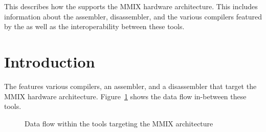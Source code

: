 




\renewcommand{\seemmix}{}

{This \documentation{} describes how the \ecs{} supports the MMIX hardware architecture.
This includes information about the assembler, disassembler, and the various compilers featured by the \ecs{} as well as the interoperability between these tools.}

\section{Introduction}

The \ecs{} features various compilers, an assembler, and a disassembler that target the MMIX hardware architecture.
Figure~\ref{fig:mmixdataflow} shows the data flow in-between these tools.

\begin{figure}
\caption{Data flow within the tools targeting the MMIX architecture}
\label{fig:mmixdataflow}
\end{figure}

